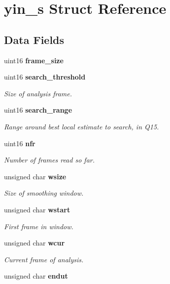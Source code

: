 \section{yin\-\_\-s Struct Reference}
\label{structyin__s}
\subsection*{Data Fields}
\begin{DoxyCompactItemize}
\item 
uint16 {\bfseries frame\-\_\-size}\label{structyin__s_a25a7e0400397ab1fcbf82f4d0568722a}

\item 
uint16 {\bf search\-\_\-threshold}
\begin{DoxyCompactList}\small\item\em Size of analysis frame. \end{DoxyCompactList}\item 
uint16 {\bf search\-\_\-range}\label{structyin__s_a208dfba1535fdd31962e687d82913dfd}

\begin{DoxyCompactList}\small\item\em Range around best local estimate to search, in Q15. \end{DoxyCompactList}\item 
uint16 {\bf nfr}
\begin{DoxyCompactList}\small\item\em Number of frames read so far. \end{DoxyCompactList}\item 
unsigned char {\bf wsize}
\begin{DoxyCompactList}\small\item\em Size of smoothing window. \end{DoxyCompactList}\item 
unsigned char {\bf wstart}
\begin{DoxyCompactList}\small\item\em First frame in window. \end{DoxyCompactList}\item 
unsigned char {\bf wcur}
\begin{DoxyCompactList}\small\item\em Current frame of analysis. \end{DoxyCompactList}\item 
unsigned char {\bf endut}\label{structyin__s_a61ca0fc8444a1bdde10aca37dc9f0f56}


\end{DoxyCompactItemize}
